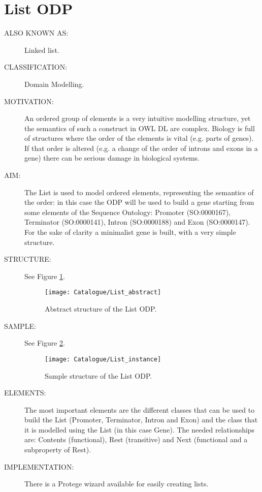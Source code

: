  \section{List ODP}\begin{description}
\item [ALSO KNOWN AS:] Linked list.

\item [CLASSIFICATION:] Domain Modelling.

\item [MOTIVATION:] An ordered group of elements is a very intuitive modelling structure, yet the semantics of such a construct in OWL DL are complex. Biology is full of structures where the order of the elements is vital (e.g. parts of genes). If that order is altered (e.g. a change of the order of introns and exons in a gene) there can be serious damage in biological systems.

\item [AIM:] The List is used to model ordered elements, representing the semantics of the order: in this case the ODP will be used to build a gene starting from some elements of the Sequence Ontology: Promoter (SO:0000167), Terminator (SO:0000141), Intron (SO:0000188) and Exon (SO:0000147). For the sake of clarity a minimalist gene is built, with a very simple structure.

\item [STRUCTURE:] See Figure \ref{odp:List_abstract}.
\begin{figure}[]\centering\texttt{[image: Catalogue/List\_abstract]}\caption{\label{odp:List_abstract} Abstract structure of the List ODP.}\end{figure}

\item [SAMPLE:] See Figure \ref{odp:List_instance}.
\begin{figure}[]\centering\texttt{[image: Catalogue/List\_instance]}\caption{\label{odp:List_instance} Sample structure of the List ODP.}\end{figure}

\item [ELEMENTS:] The most important elements are the different classes that can be used to build the List (Promoter, Terminator, Intron and Exon) and the class that it is modelled using the List (in this case Gene). The needed relationships are: Contents (functional), Rest (transitive) and Next (functional and a subproperty of Rest).

\item [IMPLEMENTATION:] There is a Protege wizard available for easily creating lists.


\end{description}

